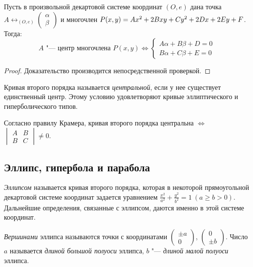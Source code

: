 \begin{proposition}
	Пусть в произвольной декартовой системе координат $(O, e)$ дана точка $A \leftrightarrow_{(O, e)} \begin{pmatrix}\alpha\\\beta\end{pmatrix}$ и многочлен $P(x, y) \hm{=} Ax^2 + 2Bxy + Cy^2 + 2Dx + 2Ey + F$. Тогда:
	\[A \text{ "--- центр многочлена } P(x, y) \Leftrightarrow \left\{\begin{aligned}
	A\alpha + B\beta + D = 0\\
	B\alpha + C\beta + E = 0
	\end{aligned}\right.\]
\end{proposition}

\begin{proof}
	Доказательство производится непосредственной проверкой.
\end{proof}

\begin{definition}
	Кривая второго порядка называется \textit{центральной}, если у нее существует единственный центр. Этому условию удовлетворяют кривые эллиптического и гиперболического типов.
\end{definition}

\begin{note}
	Согласно правилу Крамера, кривая второго порядка центральна $\Leftrightarrow$ $\begin{vmatrix}
	A&B\\
	B&C
	\end{vmatrix} \ne 0$.
\end{note}

\subsection{Эллипс, гипербола и парабола}
\begin{definition}
	\textit{Эллипсом} называется кривая второго порядка, которая в некоторой прямоугольной декартовой системе координат задается уравнением $\frac{x^2}{a^2} + \frac{y^2}{b^2} = 1~(a \ge b > 0)$. Дальнейшие определения, связанные с эллипсом, даются именно в этой системе координат.
\end{definition}

\begin{definition}
	\textit{Вершинами} эллипса называются точки с координатами $\begin{pmatrix}\pm a\\0\end{pmatrix}$, $\begin{pmatrix}0\\\pm b\end{pmatrix}$. Число $a$ называется \textit{длиной большой полуоси} эллипса, $b$ "--- \textit{длиной малой полуоси} эллипса.
\end{definition}

